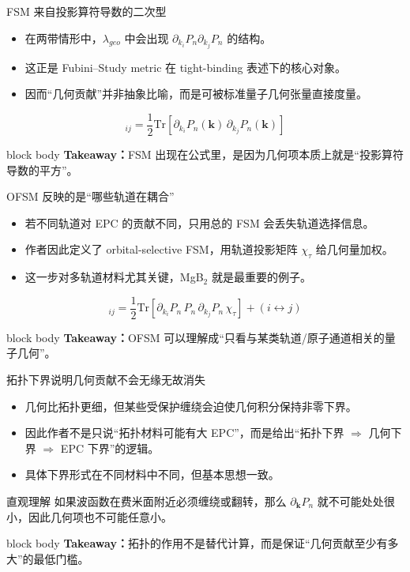 \documentclass[aspectratio=169,11pt,UTF8]{ctexbeamer}
\newcommand{\takeaway}[1]{%
  \vfill
  \begin{beamercolorbox}[wd=\textwidth,sep=0.7ex,rounded=true]{block body}
    \small\textbf{Takeaway：}#1
  \end{beamercolorbox}
}
\begin{document}
\begin{frame}{FSM 来自投影算符导数的二次型}
  \begin{itemize}
    \item 在两带情形中，$\lambda_{geo}$ 中会出现 $\partial_{k_i}P_n \partial_{k_j}P_n$ 的结构。
    \item 这正是 Fubini--Study metric 在 tight-binding 表述下的核心对象。
    \item 因而“几何贡献”并非抽象比喻，而是可被标准量子几何张量直接度量。
  \end{itemize}
  \begin{equation*}
    [g_n(\mathbf{k})]_{ij}
    =
    \frac{1}{2}
    \mathrm{Tr}\!\left[\partial_{k_i}P_n(\mathbf{k})\,\partial_{k_j}P_n(\mathbf{k})\right]
  \end{equation*}
  \takeaway{FSM 出现在公式里，是因为几何项本质上就是“投影算符导数的平方”。}
\end{frame}

\begin{frame}{OFSM 反映的是“哪些轨道在耦合”}
  \begin{itemize}
    \item 若不同轨道对 EPC 的贡献不同，只用总的 FSM 会丢失轨道选择信息。
    \item 作者因此定义了 orbital-selective FSM，用轨道投影矩阵 $\chi_\tau$ 给几何量加权。
    \item 这一步对多轨道材料尤其关键，MgB$_2$ 就是最重要的例子。
  \end{itemize}
  \begin{equation*}
    [g_{n,\tau}(\mathbf{k})]_{ij}
    =
    \frac{1}{2}\mathrm{Tr}\!\left[
      \partial_{k_i}P_n \, P_n \, \partial_{k_j}P_n \, \chi_\tau
    \right] + (i \leftrightarrow j)
  \end{equation*}
  \takeaway{OFSM 可以理解成“只看与某类轨道/原子通道相关的量子几何”。}
\end{frame}

\begin{frame}{拓扑下界说明几何贡献不会无缘无故消失}
  \begin{itemize}
    \item 几何比拓扑更细，但某些受保护缠绕会迫使几何积分保持非零下界。
    \item 因此作者不是只说“拓扑材料可能有大 EPC”，而是给出“拓扑下界 $\Rightarrow$ 几何下界 $\Rightarrow$ EPC 下界”的逻辑。
    \item 具体下界形式在不同材料中不同，但基本思想一致。
  \end{itemize}
  \begin{block}{直观理解}
    如果波函数在费米面附近必须缠绕或翻转，那么 $\partial_{\mathbf{k}}P_n$ 就不可能处处很小，因此几何项也不可能任意小。
  \end{block}
  \takeaway{拓扑的作用不是替代计算，而是保证“几何贡献至少有多大”的最低门槛。}
\end{frame}
\end{document}
